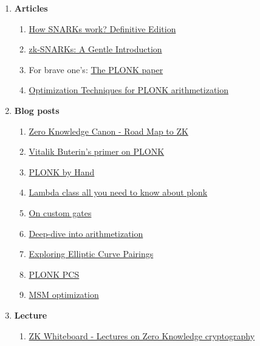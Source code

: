 \begin{enumerate}
    \item \textbf{Articles}
    \begin{enumerate}
        \item \href{https://arxiv.org/pdf/1906.07221.pdf}{How SNARKs work? Definitive Edition}
        \item \href{https://www.di.ens.fr/~nitulesc/files/Survey-SNARKs.pdf}{zk-SNARKs: A Gentle Introduction}
        \item For brave one's: \href{https://eprint.iacr.org/2019/953.pdf}{The PLONK paper}
        \item \href{https://eprint.iacr.org/2022/462.pdf}{Optimization Techniques for PLONK arithmetization}
    \end{enumerate}
    \item \textbf{Blog posts}
    \begin{enumerate}
        \item \href{https://a16zcrypto.com/posts/article/zero-knowledge-canon/#section--1}{Zero Knowledge Canon - Road Map to ZK}
        \item \href{https://vitalik.ca/general/2019/09/22/plonk.html}{Vitalik Buterin's primer on PLONK}
        \item \href{https://research.metastate.dev/plonk-by-hand-part-1/}{PLONK by Hand}
        \item \href{https://blog.lambdaclass.com/all-you-wanted-to-know-about-plonk/}{Lambda class all you need to know about plonk}
        \item \href{https://kobi.one/2021/05/20/plonk-custom-gates.html}{On custom gates}
        \item \href{https://hackmd.io/@jake/plonk-arithmetization}{Deep-dive into arithmetization}
        \item \href{https://medium.com/@VitalikButerin/exploring-elliptic-curve-pairings-c73c1864e627}{Exploring Elliptic Curve Pairings}
        \item \href{https://hackmd.io/@jake/plonk-pcs}{PLONK PCS}
        \item \href{https://hackmd.io/@tazAymRSQCGXTUKkbh1BAg/Sk27liTW9}{MSM optimization}
    \end{enumerate}
    \item \textbf{Lecture}
    \begin{enumerate}
        \item \href{https://zkhack.dev/whiteboard/}{ZK Whiteboard - Lectures on Zero Knowledge cryptography}
    \end{enumerate}
\end{enumerate}

